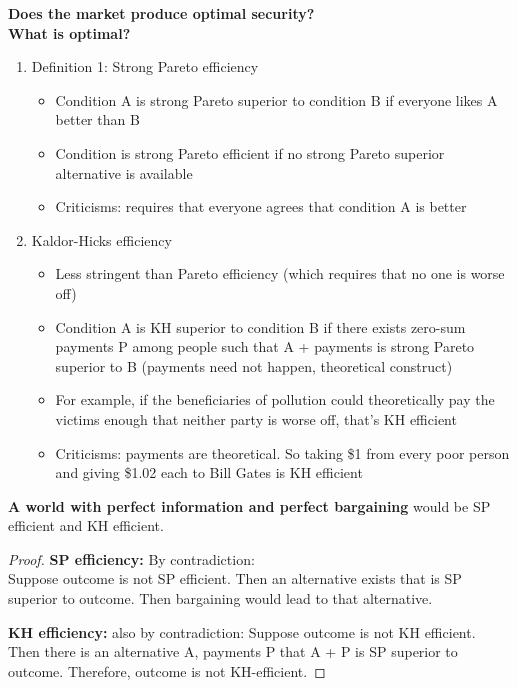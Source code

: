 
\textbf{Does the market produce optimal security?}\\
\textbf{What is optimal?}

\begin{enumerate}
	\item Definition 1: Strong Pareto efficiency

	\begin{itemize}
		\item Condition A is strong Pareto superior to condition B if everyone likes A better than B
		\item Condition is strong Pareto efficient if no strong Pareto superior alternative is available
		\item Criticisms: requires that everyone agrees that condition A is better
	\end{itemize}
	
	\item Kaldor-Hicks efficiency

	\begin{itemize}
		\item Less stringent than Pareto efficiency (which requires that no one is worse off)
		\item  Condition A is KH superior to condition B if there exists zero-sum payments P among people such that A + payments is strong Pareto superior to B
	(payments need not happen, theoretical construct)
		\item For example, if the beneficiaries of pollution could theoretically pay the victims enough that neither party is worse off, that's KH efficient
		\item Criticisms: payments are theoretical. So taking \$1 from every poor person and giving \$1.02 each to Bill Gates is KH efficient
	\end{itemize}
\end{enumerate}

\textbf{A world with perfect information and perfect bargaining} would be SP efficient and KH efficient. 

\begin{proof}
\textbf{SP efficiency:} By contradiction: \\
	Suppose outcome is not SP efficient. Then an alternative exists that is SP superior to outcome. Then bargaining would lead to that alternative.

\textbf{KH efficiency:} also by contradiction:
	Suppose outcome is not KH efficient. Then there is an alternative A, payments P that A + P is SP superior to outcome. Therefore, outcome is not KH-efficient.
\end{proof}

